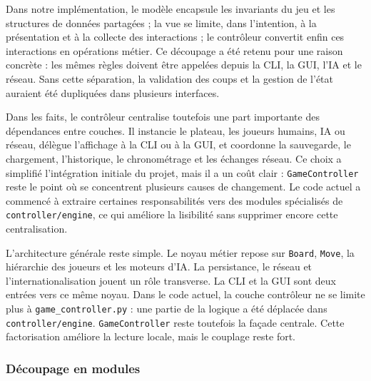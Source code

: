 \documentclass[a4paper]{article}
\begin{document}
Dans notre implémentation, le modèle encapsule les invariants du jeu et les structures de données partagées ; la vue se limite, dans l'intention, à la présentation et à la collecte des interactions ; le contrôleur convertit enfin ces interactions en opérations métier. Ce découpage a été retenu pour une raison concrète : les mêmes règles doivent être appelées depuis la CLI, la GUI, l'IA et le réseau. Sans cette séparation, la validation des coups et la gestion de l'état auraient été dupliquées dans plusieurs interfaces.

Dans les faits, le contrôleur centralise toutefois une part importante des dépendances entre couches. Il instancie le plateau, les joueurs humains, IA ou réseau, délègue l'affichage à la CLI ou à la GUI, et coordonne la sauvegarde, le chargement, l'historique, le chronométrage et les échanges réseau. Ce choix a simplifié l'intégration initiale du projet, mais il a un coût clair : \texttt{GameController} reste le point où se concentrent plusieurs causes de changement. Le code actuel a commencé à extraire certaines responsabilités vers des modules spécialisés de \texttt{controller/engine}, ce qui améliore la lisibilité sans supprimer encore cette centralisation.

L'architecture générale reste simple. Le noyau métier repose sur \texttt{Board}, \texttt{Move}, la hiérarchie des joueurs et les moteurs d'IA. La persistance, le réseau et l'internationalisation jouent un rôle transverse. La CLI et la GUI sont deux entrées vers ce même noyau. Dans le code actuel, la couche contrôleur ne se limite plus à \texttt{game\_controller.py} : une partie de la logique a été déplacée dans \texttt{controller/engine}. \texttt{GameController} reste toutefois la façade centrale. Cette factorisation améliore la lecture locale, mais le couplage reste fort.

\subsubsection{Découpage en modules}
\end{document}
